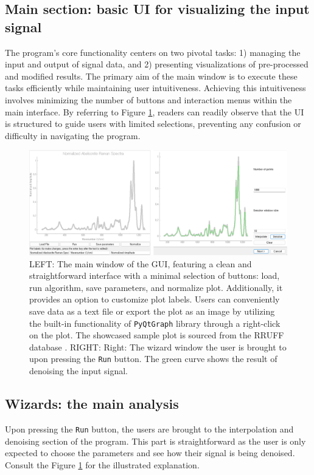 \documentclass{article}
\begin{document}
\subsection{Main section: basic UI for visualizing the input signal}
The program's core functionality centers on two pivotal tasks: 1) managing the input and output of signal data, and 2) presenting visualizations of pre-processed and modified results.
The primary aim of the main window is to execute these tasks efficiently while maintaining user intuitiveness.
Achieving this intuitiveness involves minimizing the number of buttons and interaction menus within the main interface.
By referring to Figure \ref{fig:main_window}, readers can readily observe that the UI is structured to guide users with limited selections, preventing any confusion or difficulty in navigating the program.
\begin{figure}[hbt!]
    \centering
    \includegraphics[width=\linewidth]{main_window.png}
    \caption{LEFT: The main window of the GUI, featuring a clean and straightforward interface with a minimal selection of buttons: load, run algorithm, save parameters, and normalize plot. Additionally, it provides an option to customize plot labels. Users can conveniently save data as a text file or export the plot as an image by utilizing the built-in functionality of \lstinline{PyQtGraph} library through a right-click on the plot. The showcased sample plot is sourced from the RRUFF database \cite{rruff}.
    RIGHT: Right: The wizard window the user is brought to upon pressing the \lstinline|Run| button. The green curve shows the result of denoising the input signal.}
    \label{fig:main_window}
\end{figure}

%
%
\subsection{Wizards: the main analysis}
Upon pressing the \lstinline|Run| button, the users are brought to the interpolation and denoising section of the program.
This part is straightforward as the user is only expected to choose the parameters and see how their signal is being denoised.
Consult the Figure \ref{fig:main_window} for the illustrated explanation.
\end{document}
